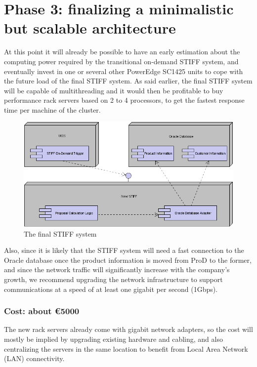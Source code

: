\section{Phase 3: finalizing a minimalistic but scalable architecture}

At this point it will already be possible to have an early estimation
about the computing power required by the transitional on-demand STIFF
system, and eventually invest in one or several other PowerEdge SC1425
units to cope with the future load of the final STIFF system.
As said earlier, the final STIFF system will be capable of multithreading
and it would then be profitable to buy performance rack servers based on
2 to 4 processors, to get the fastest response time per machine of the
cluster.

\begin{figure}
\includegraphics[width=\linewidth]{img/net_3.png}
\caption{The final STIFF system}
\label{fig:net_3}
\end{figure}

Also, since it is likely that the STIFF system will need a fast connection
to the Oracle database once the product information is moved from ProD
to the former, and since the network traffic will significantly increase
with the company's growth, we recommend upgrading the network infrastructure
to support communications at a speed of at least one gigabit per second (1Gbps).

\subsubsection{Cost: about \euro5000}

The new rack servers already come with gigabit network adapters, so the cost
will mostly be implied by upgrading existing hardware and cabling, and also
centralizing the servers in the same location to benefit from Local Area
Network (LAN) connectivity.

